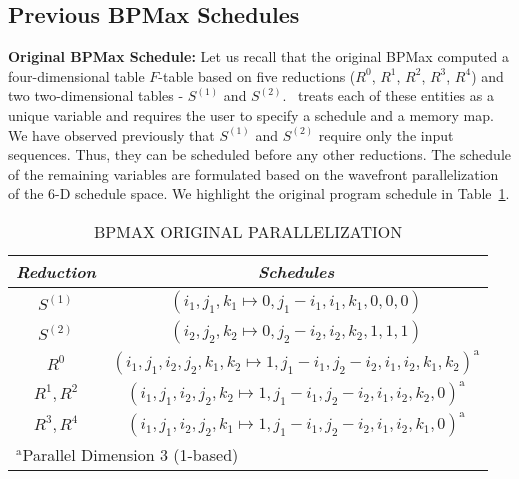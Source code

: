 \subsection{Previous BPMax Schedules}
\textbf{Original BPMax Schedule:}
Let us recall that the original BPMax computed a four-dimensional table $F$-table based on five reductions ($R^{0}$, $R^{1}$, $R^{2}$, $R^{3}$, $R^{4}$) and two two-dimensional tables - $S^{(1)}$ and $S^{(2)}$. \alphaz\ treats each of these entities as a unique variable and requires the user to specify a schedule and a memory map. We have observed previously that $S^{(1)}$ and $S^{(2)}$ require only the input sequences. Thus, they can be scheduled before any other reductions. The schedule of the remaining variables are formulated based on the wavefront parallelization of the 6-D schedule space. We highlight the original program schedule in Table~\ref{tab:bpm_original_schedule}.
\begin{table}[htbp]
\caption{\uppercase{BPMax original Parallelization}}
\begin{center}
\begin{tabular}{|c|c|}
\hline
\textbf{\textit{Reduction}}& \textbf{\textit{Schedules}} \\
\hline
$S^{(1)}$ & $(i_{1},j_{1}, k_{1} \mapsto  0, j_{1}-i_{1}, i_{1}, k_{1}, 0, 0, 0)$   \\
\cline{1-2} 
$S^{(2)}$ & $(i_{2},j_{2}, k_{2} \mapsto  0, j_{2}-i_{2}, i_{2}, k_{2}, 1, 1, 1)$   \\
\cline{1-2} 
$R^{0}$ & $(i_{1},j_{1},i_{2},j_{2},k_{1},k_{2} \mapsto 1, j_{1}-i_{1}, j_{2}-i_{2}, i_{1}, i_{2}, k_{1}, k_{2})^{\mathrm{a}}$    \\
 \cline{1-2} 
$R^{1}, R^{2}$ & $(i_{1},j_{1},i_{2},j_{2},k_{2} \mapsto 1, j_{1}-i_{1}, j_{2}-i_{2}, i_{1}, i_{2}, k_{2}, 0)^{\mathrm{a}}$   \\
\cline{1-2} 
$R^{3}, R^{4}$ & $(i_{1},j_{1},i_{2},j_{2},k_{1} \mapsto 1, j_{1}-i_{1}, j_{2}-i_{2}, i_{1}, i_{2}, k_{1}, 0)^{\mathrm{a}}$ \\
 \cline{1-2} 
\hline
\multicolumn{2}{l}{$^{\mathrm{a}}$Parallel Dimension 3 (1-based)}
\end{tabular}
\label{tab:bpm_original_schedule}
\end{center}
\end{table}